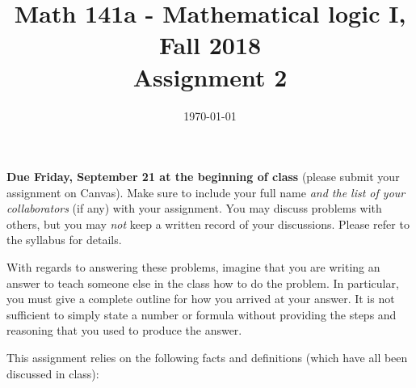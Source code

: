 \documentclass{amsart}
\title[Math 141a, Fall 2018: assignment 2]{Math 141a - Mathematical logic I, Fall 2018 \\ Assignment 2}
\date{\today}
\theoremstyle{definition}
\begin{document}

\maketitle

\textbf{Due Friday, September 21 at the beginning of class} (please submit your assignment on Canvas). Make sure to include your full name \emph{and the list of your collaborators} (if any) with your assignment. You may discuss problems with others, but you may \emph{not} keep a written record of your discussions. Please refer to the syllabus for details.

With regards to answering these problems, imagine that you are writing an answer to teach someone else in the class how to do the problem. In particular, you must give a complete outline for how you arrived at your answer. It is not sufficient to simply state a number or formula without providing the steps and reasoning that you used to produce the answer.

This assignment relies on the following facts and definitions (which have all been discussed in class):
\end{document}
